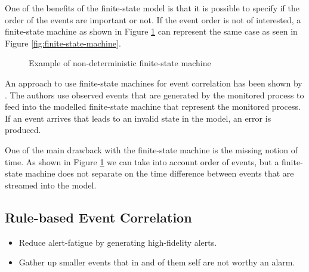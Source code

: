 One of the benefits of the finite-state model is that it is possible to specify if the order of the events are important or not. If the event order is not of interested, a finite-state machine as shown in Figure \ref{fig:finite-state-machine-2} can represent the same case as seen in Figure \ref{fig:finite-state-machine}.
\begin{figure}[ht]
\centering
{}
\caption{Example of non-deterministic finite-state machine}
\label{fig:finite-state-machine-2}
\end{figure}

An approach to use finite-state machines for event correlation has been shown by \textcite{Bouloutas_1992}. The authors use observed events that are generated by the monitored process to feed into the modelled finite-state machine that represent the monitored process. If an event arrives that leads to an invalid state in the model, an error is produced.

One of the main drawback with the finite-state machine is the missing notion of time. As shown in Figure \ref{fig:finite-state-machine-2} we can take into account order of events, but a finite-state machine does not separate on the time difference between events that are streamed into the model.

\subsection{Rule-based Event Correlation}


\begin{itemize}
    \item Reduce alert-fatigue by generating high-fidelity alerts.
    \item Gather up smaller events that in and of them self are not worthy an alarm.
\end{itemize}

